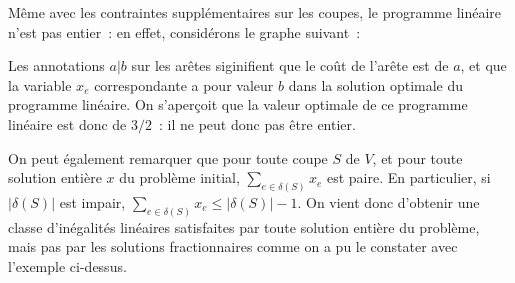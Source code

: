 \documentclass[a4paper,10pt]{article}
\begin{document}
Même avec les contraintes supplémentaires sur les coupes, le programme linéaire n'est pas entier~: en effet, considérons le graphe suivant~:

\begin {center}
\end{center}

Les annotations $a|b$ sur les arêtes siginifient que le coût de l'arête est de $a$, et que la variable $x_e$ correspondante a pour valeur $b$ dans la solution optimale du programme linéaire. On s'aperçoit que la valeur optimale de ce programme linéaire est donc de $3/2$~: il ne peut donc pas être entier.

On peut également remarquer que pour toute coupe $S$ de $V$, et pour toute solution entière $x$ du problème initial, $\sum_{e\in\delta(S)} x_e$ est paire. En particulier, si $|\delta(S)|$ est impair, $\sum_{e\in\delta(S)} x_e \leq |\delta(S)| - 1$. On vient donc d'obtenir une classe d'inégalités linéaires satisfaites par toute solution entière du problème, mais pas par les solutions fractionnaires comme on a pu le constater avec l'exemple ci-dessus.
\end{document}
